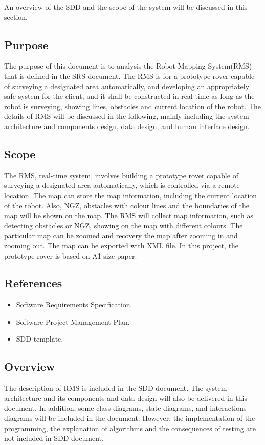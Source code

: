 An overview of the SDD and the scope of the system will be discussed in this section.

\subsection{Purpose}
The purpose of this document is to analysis the Robot Mapping System(RMS) that is defined in the SRS document. The RMS is for a prototype rover capable of surveying a designated area automatically, and developing an appropriately safe system for the client, and it shall be constructed  in real time as long as the robot is surveying, showing lines, obstacles and current location of the robot. The details of RMS will be discussed in the following, mainly including the system architecture and components design, data design, and human interface design.

\subsection{Scope}
The RMS, real-time system, involves building a prototype rover capable of surveying a designated area automatically, which is controlled via a remote location. The map can store the map information, including the current location of the robot. Also, NGZ, obstacles with colour lines and the boundaries of the map will be shown on the map.  The RMS will collect map information, such as detecting obstacles or NGZ, showing on the map with different colours. The particular map can be zoomed and recovery the map after zooming in and zooming out.  The map can be exported with XML file.
In this project, the prototype rover is based on A1 size paper.


\subsection{References}
\begin{itemize}
	\item Software Requirements Specification.
	\item Software Project Management Plan.
	\item SDD template.
\end{itemize}	

\subsection{Overview}
The description of RMS is included in the SDD document. The system architecture and its components and data design will also be delivered in this document. In addition, some class diagrams, state diagrams, and interactions diagrams will be included in the document. However, the implementation of the programming, the explanation of algorithms and the consequences of testing are not included in SDD document. 

